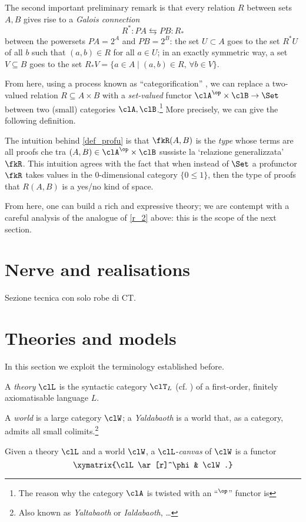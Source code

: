 \documentclass[a4paper]{../birkjour}
\begin{document}
The second important preliminary remark is that every relation $R$ between sets $A,B$ gives rise to a \emph{Galois connection} 
\[R^* :PA \leftrightarrows PB : R_*\]
between the powersets $PA=2^A$ and $PB = 2^B$: the set $U\subset A$ goes to the set $R^*U$ of all $b$ such that $(a,b)\in R$ for all $a\in U$; in an exactly symmetric way, a set $V\subseteq B$ goes to the set $R_*V = \{a\in A\mid (a,b) \in R,\, \forall b\in V\}$.

From here, using a process known as ``categorification'' \cite{baez_catego}, we can replace a two-valued relation $R\subseteq A\times B$ with a \emph{set-valued} functor $\clA^\op\times\clB \to \Set$ between two (small) categories $\clA,\clB$.\footnote{The reason why the category $\clA$ is twisted with an ``$^\op$'' functor is } More precisely, we can give the following definition.
\begin{definition}[Profunctor]\label{def_profu}
  
\end{definition}
The intuition behind \autoref{def_profu} is that $\fkR(A,B)$ is the \emph{type} whose terms are all proofs che tra $(A,B)\in\clA^\op\times\clB$ sussiste la `relazione generalizzata' $\fkR$. This intuition agrees with the fact that when instead of $\Set$ a profunctor $\fkR$ takes values in the 0-dimensional category $\{0\le 1\}$, then the type of proofs that $R(A,B)$ is a yes/no kind of space.

From here, one can build a rich and expressive theory; we are contempt with a careful analysis of the analogue of \ref{r_2} above: this is the scope of the next section.
\section{Nerve and realisations}
\label{sec:org1a423df}
Sezione tecnica con solo robe di CT.
\section{Theories and models}
\label{sec:orge02f333}
In this section we exploit the terminology established before.
\begin{definition}[Theory]
  A \emph{theory} $\clL$ is the syntactic category $\clT_L$ (cf. \cite{lambek1988introduction}) of a first-order, finitely axiomatisable language $L$.
\end{definition}
\begin{definition}
  A \emph{world} is a large category $\clW$; a \emph{Yaldabaoth} is a world that, as a category, admits all small colimits.\footnote{Also known as \emph{Yaltabaoth} or \emph{Ialdabaoth}, \dots}
\end{definition}
Given a theory $\clL$ and a world $\clW$, a $\clL$-\emph{canvas} of $\clW$ is a functor 
\[\xymatrix{\clL \ar[r]^\phi & \clW.}\]
\end{document}

